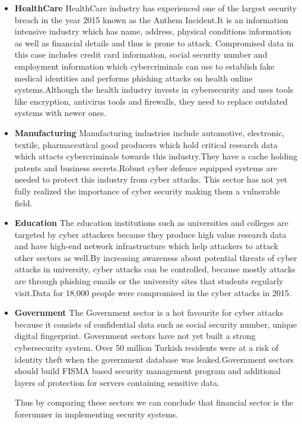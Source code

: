 \documentclass{article}
\begin{document}
\begin{enumerate}[label=\alph*]
\begin{itemize}
\item \textbf{HealthCare}
HealthCare industry has experienced one of the largest security breach in the year 2015 known as the Anthem Incident.It is an information intensive industry which has name, address, physical conditions information as well as financial details and thus is prone to attack. Compromised data in this case includes credit card information, social security number and employment information which cybercriminals can use to establish fake medical identities and performs phishing attacks on health online systems.Although the health industry invests in cybersecurity and uses tools like encryption, antivirus tools and firewalls, they need to replace outdated systems with newer ones.

\item \textbf{Manufacturing}
Manufacturing industries include automotive, electronic, textile, pharmaceutical good producers which hold critical research data which attacts cybercriminals towards this industry.They have a cache holding patents and business secrets.Robust cyber defence equipped systems are needed to protect this industry from cyber attacks. This sector has not yet fully realized the importance of cyber security making them a vulnerable field.

\item \textbf{Education}
The education institutions such as universities and colleges are targeted by cyber attackers because they produce high value research data and have high-end network infrastructure which help attackers to attack other sectors as well.By increasing awareness about potential threats of cyber attacks in university, cyber attacks can be controlled, because mostly attacks are through phishing emails or the university sites that students regularly visit.Data for 18,000 people were compromised in the cyber attacks in 2015.

\item \textbf{Government}
The Government sector is a hot favourite for cyber attacks because it consists of confidential data such as social security number, unique digital fingerprint. Government sectors have not yet built a strong cybersecurity system. Over 50 million Turkish residents were at a risk of identity theft when the government database was leaked.Government sectors should build FISMA based security management program and additional layers of protection for servers containing sensitive data.

Thus by comparing these sectors we can conclude that financial sector is the forerunner in implementing security systems.

\end{itemize}
\end{enumerate}
\end{document}
